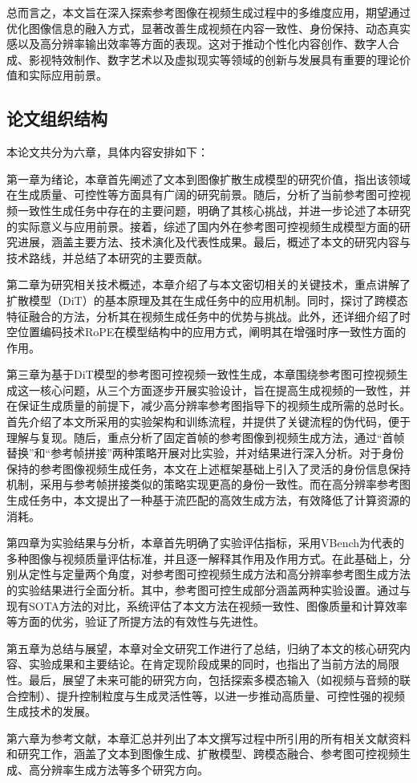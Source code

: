 总而言之，本文旨在深入探索参考图像在视频生成过程中的多维度应用，期望通过优化图像信息的融入方式，显著改善生成视频在内容一致性、身份保持、动态真实感以及高分辨率输出效率等方面的表现。这对于推动个性化内容创作、数字人合成、影视特效制作、数字艺术以及虚拟现实等领域的创新与发展具有重要的理论价值和实际应用前景。

\subsection{论文组织结构}
本论文共分为六章，具体内容安排如下：

第一章为绪论，本章首先阐述了文本到图像扩散生成模型的研究价值，指出该领域在生成质量、可控性等方面具有广阔的研究前景。随后，分析了当前参考图可控视频一致性生成任务中存在的主要问题，明确了其核心挑战，并进一步论述了本研究的实际意义与应用前景。接着，综述了国内外在参考图可控视频生成模型方面的研究进展，涵盖主要方法、技术演化及代表性成果。最后，概述了本文的研究内容与技术路线，并总结了本研究的主要贡献。

第二章为研究相关技术概述，本章介绍了与本文密切相关的关键技术，重点讲解了扩散模型（DiT）的基本原理及其在生成任务中的应用机制。同时，探讨了跨模态特征融合的方法，分析其在视频生成任务中的优势与挑战。此外，还详细介绍了时空位置编码技术RoPE在模型结构中的应用方式，阐明其在增强时序一致性方面的作用。

第三章为基于DiT模型的参考图可控视频一致性生成，本章围绕参考图可控视频生成这一核心问题，从三个方面逐步开展实验设计，旨在提高生成视频的一致性，并在保证生成质量的前提下，减少高分辨率参考图指导下的视频生成所需的总时长。首先介绍了本文所采用的实验架构和训练流程，并提供了关键流程的伪代码，便于理解与复现。随后，重点分析了固定首帧的参考图像到视频生成方法，通过“首帧替换”和“参考帧拼接”两种策略开展对比实验，并对结果进行深入分析。对于身份保持的参考图像视频生成任务，本文在上述框架基础上引入了灵活的身份信息保持机制，采用与参考帧拼接类似的策略实现更高的身份一致性。而在高分辨率参考图生成任务中，本文提出了一种基于流匹配的高效生成方法，有效降低了计算资源的消耗。

第四章为实验结果与分析，本章首先明确了实验评估指标，采用VBench为代表的多种图像与视频质量评估标准，并且逐一解释其作用及作用方式。在此基础上，分别从定性与定量两个角度，对参考图可控视频生成方法和高分辨率参考图生成方法的实验结果进行全面分析。其中，参考图可控生成部分涵盖两种实验设置。通过与现有SOTA方法的对比，系统评估了本文方法在视频一致性、图像质量和计算效率等方面的优劣，验证了所提方法的有效性与先进性。

第五章为总结与展望，本章对全文研究工作进行了总结，归纳了本文的核心研究内容、实验成果和主要结论。在肯定现阶段成果的同时，也指出了当前方法的局限性。最后，展望了未来可能的研究方向，包括探索多模态输入（如视频与音频的联合控制）、提升控制粒度与生成灵活性等，以进一步推动高质量、可控性强的视频生成技术的发展。

第六章为参考文献，本章汇总并列出了本文撰写过程中所引用的所有相关文献资料和研究工作，涵盖了文本到图像生成、扩散模型、跨模态融合、参考图可控视频生成、高分辨率生成方法等多个研究方向。
